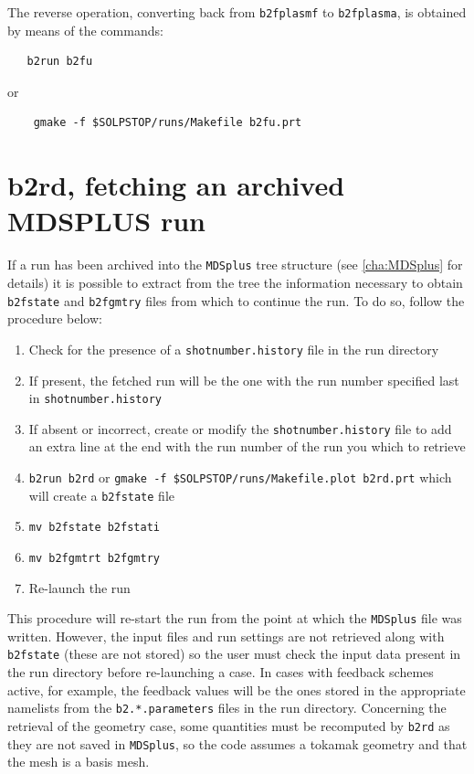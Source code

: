 \documentclass[a4paper,10pt]{report}
\begin{document}
The reverse operation, converting back from {\tt b2fplasmf} to {\tt b2fplasma}, is
obtained by means of the commands:
\begin{verbatim}
   b2run b2fu
\end{verbatim}
or
\begin{verbatim}
    gmake -f $SOLPSTOP/runs/Makefile b2fu.prt
\end{verbatim}

\newpage
\section{b2rd, fetching an archived MDSPLUS run}
\label{sec:b2rd}

If a run has been archived into the {\tt MDSplus} tree structure (see \ref{cha:MDSplus} for details)
it is possible to extract from the tree the information necessary to obtain {\tt b2fstate} and {\tt b2fgmtry} files
from which to continue the run. To do so, follow the procedure below:
\begin{enumerate}
  \item Check for the presence of a {\tt shotnumber.history} file in the run directory
  \item If present, the fetched run will be the one with the run number specified last in {\tt shotnumber.history}
  \item If absent or incorrect, create or modify the {\tt shotnumber.history} file to add an extra line at the end with the run number of the run you which to retrieve
  \item {\tt b2run b2rd} or {\tt gmake -f \$SOLPSTOP/runs/Makefile.plot b2rd.prt} which will create a {\tt b2fstate} file
  \item {\tt mv b2fstate b2fstati}
  \item {\tt mv b2fgmtrt b2fgmtry}
  \item Re-launch the run
\end{enumerate}

This procedure will re-start the run from the point at which the {\tt MDSplus} file was written. However, the input files
and run settings are not retrieved along with {\tt b2fstate} (these are not stored) so the user must check the input data
present in the run directory before re-launching a case. In cases with feedback schemes active, for example, the feedback
values will be the ones stored in the appropriate namelists from the {\tt b2.*.parameters} files in the run directory. Concerning the retrieval of the geometry case, some quantities must be recomputed by {\tt b2rd} as they are not saved in {\tt MDSplus}, so the code assumes a tokamak geometry and that the mesh is a basis mesh.
\end{document}
